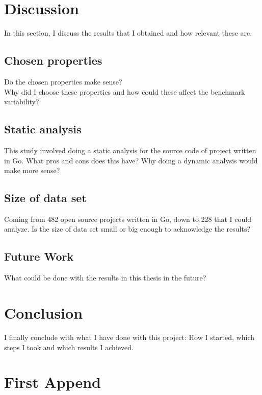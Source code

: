 \documentclass{seal_thesis}
\begin{document}
\chapter{Discussion}
\label{Discussion}
In this section, I discuss the results that I obtained and how relevant these are.
\section{Chosen properties}
Do the chosen properties make sense? \\
Why did I choose these properties and how could these affect the benchmark variability? \\

\section{Static analysis}
This study involved doing a static analysis for the source code of project written in Go. What pros and cons does this have? Why doing a dynamic analysis would make more sense?

\section{Size of data set}
Coming from 482 open source projects written in Go, down to 228 that I could analyze. Is the size of data set small or big enough to acknowledge the results?

\section{Future Work}
What could be done with the results in this thesis in the future?

\chapter{Conclusion}
\label{Conclusion}
I finally conclude with what I have done with this project: How I started, which steps I took and which results I achieved.


\appendix
\chapter{First Append}
\end{document}

